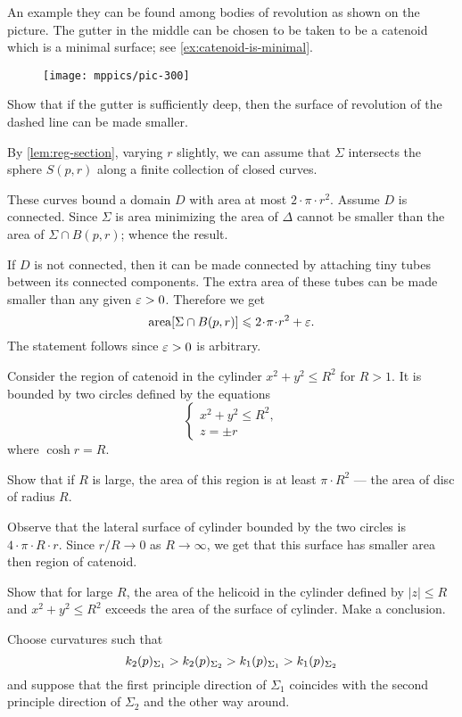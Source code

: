 An example they can be found among bodies of revolution as shown on the picture.
The gutter in the middle can be chosen to be taken to be a catenoid which is a minimal surface; see \ref{ex:catenoid-is-minimal}.
\begin{figure}[h!]
\vskip-0mm
\centering
\texttt{[image: mppics/pic-300]}
\vskip0mm
\end{figure}
Show that if the gutter is sufficiently deep, then the surface of revolution of the dashed line can be made smaller.

By \ref{lem:reg-section}, varying $r$ slightly, we can assume that $\Sigma$ intersects the sphere $S(p,r)$ along a finite collection of closed curves.

These curves bound a domain $D$ with area at most $2\cdot \pi\cdot r^2$.
Assume $D$ is connected.
Since $\Sigma$ is area minimizing the area of $\Delta$ cannot be smaller than the area of $\Sigma\cap B(p,r)$;
whence the result.

If $D$ is not connected, then
it can be made connected by attaching tiny tubes between its connected components.
The extra area of these tubes can be made smaller than any given $\varepsilon>0$.
Therefore we get 
\[\area[\Sigma\cap B(p,r)]\le 2\cdot \pi\cdot r^2+\eps.\]
The statement follows since $\varepsilon>0$ is arbitrary.




Consider the region of catenoid in the cylinder $x^2+y^2\le R^2$ for $R>1$.
It is bounded by two circles defined by the equations 
\[
\begin{cases}
x^2+y^2\le R^2,
\\
z=\pm r
\end{cases}
\]
where $\cosh r=R$.

Show that if $R$ is large, the area of this region is at least $\pi\cdot R^2$ --- the area of disc of radius $R$.

Observe that the lateral surface of cylinder bounded by the two circles is $4\cdot \pi\cdot R\cdot r$.
Since $r/R\to 0$ as $R\to \infty$, we get that this surface has smaller area then region of catenoid.


Show that for large $R$, the area of the helicoid in the cylinder defined by $|z|\le R$ and $x^2+y^2\le R^2$ exceeds the area of the surface of cylinder.
Make a conclusion.

Choose curvatures such that 
\[k_2(p)_{\Sigma_1}\z>k_2(p)_{\Sigma_2}> k_1(p)_{\Sigma_1}> k_1(p)_{\Sigma_2}\] and suppose that the first principle direction of $\Sigma_1$ coincides with the second principle direction of $\Sigma_2$ and the other way around.

